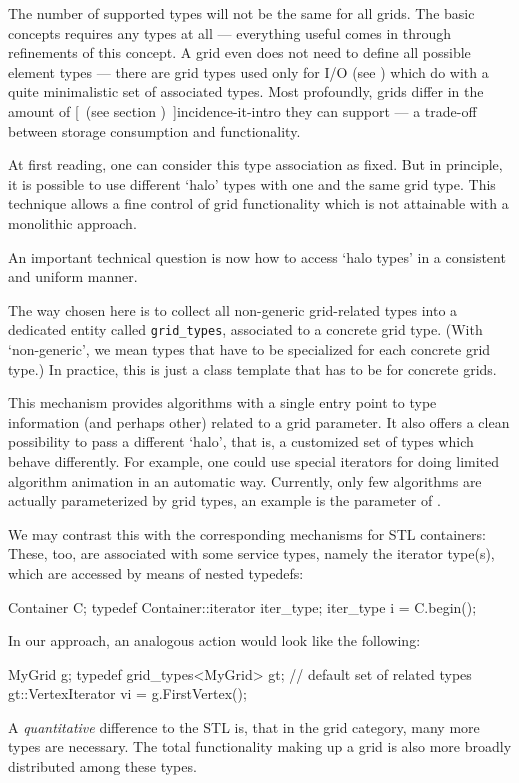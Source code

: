   The number of supported types  will not be the same for all grids.
  The basic  concepts requires any types at all
  --- everything useful comes in through refinements of this concept.
  A grid even does not need to define all possible element types ---
  there are grid types used only for I/O 
  (see )
  which do with a quite
  minimalistic set of associated types.
  Most profoundly, grids differ in the amount of
  [~(see section \Ref)~]{incidence-it-intro}
  they can support --- a trade-off between storage consumption and functionality.


  At first reading, 
  one can consider this type association as fixed.
  But in principle, it is possible to use different `halo' types 
  with one and the same grid type.
  This technique allows a fine control of grid functionality
  which is not attainable with a monolithic approach.

  \label{intro-grid-types}
  An important  technical question is now  
  how to access `halo types' in a consistent and uniform manner. 

  The way chosen here is to collect all non-generic grid-related types into
  a dedicated entity called {\tt grid_types},
   associated to a concrete grid type.
  (With `non-generic', we mean types that have to be specialized for each
  concrete grid type.) 
  In practice, this is just a class template that has to be
   for concrete grids.

  This mechanism provides algorithms with a single entry point to 
  type information (and perhaps other) related to a grid parameter.
  It also offers a clean possibility to pass a different `halo',
  that is, a customized set of types which behave differently.
  For example, one could use special iterators for doing 
  limited algorithm animation in an automatic way.
  Currently, only few algorithms are actually parameterized by 
  grid types, an example is the  parameter of 
  .
  
  We may contrast this  with the corresponding mechanisms for STL containers:
  These, too, are associated with some service types, namely the 
  iterator type(s), which are accessed by means of nested typedefs:
  \begin{example}
    Container C;
    typedef Container::iterator iter_type;
    iter_type i = C.begin();
  \end{example}
  In our approach, an analogous action would look like the following:
  \begin{example}
    MyGrid g;
    typedef grid_types<MyGrid> gt; // default set of related types
    gt::VertexIterator vi = g.FirstVertex();
  \end{example}
  A {\em quantitative\/} difference to the STL is, that in the grid category,
  many more types are necessary. 
  The total functionality making up a grid is also more broadly
  distributed among these types.

